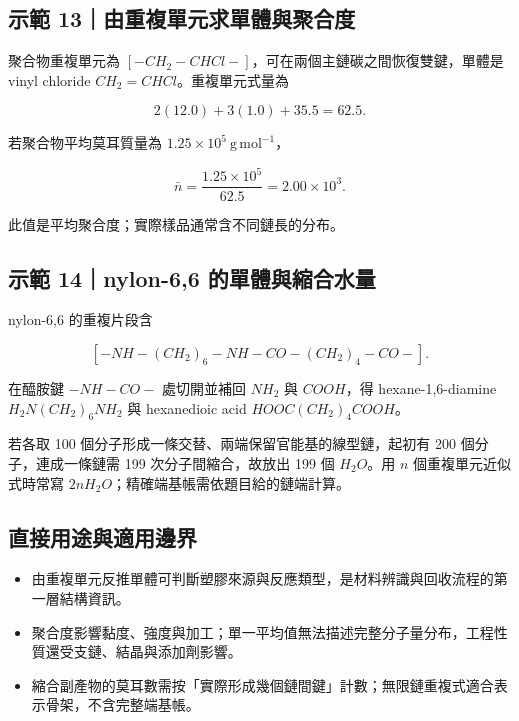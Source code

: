 \documentclass[11pt,a4paper]{article}
\providecommand{\tightlist}{%
  \setlength{\itemsep}{0pt}\setlength{\parskip}{0pt}}
\begin{document}
\begin{HandoutWorkedExample}

\subsection{示範 13｜由重複單元求單體與聚合度}\label{ux793aux7bc4-13ux7531ux91cdux8907ux55aeux5143ux6c42ux55aeux9ad4ux8207ux805aux5408ux5ea6}

聚合物重複單元為 \([-CH_2-CHCl-]\)，可在兩個主鏈碳之間恢復雙鍵，單體是 vinyl chloride \(CH_2=CHCl\)。重複單元式量為

\[
2(12.0)+3(1.0)+35.5=62.5.
\]

若聚合物平均莫耳質量為 \(1.25\times10^5\ \mathrm{g\,mol^{-1}}\)，

\[
\bar n=\frac{1.25\times10^5}{62.5}=2.00\times10^3.
\]

此值是平均聚合度；實際樣品通常含不同鏈長的分布。

\end{HandoutWorkedExample}

\begin{HandoutWorkedExample}

\subsection{示範 14｜nylon-6,6 的單體與縮合水量}\label{ux793aux7bc4-14nylon-66-ux7684ux55aeux9ad4ux8207ux7e2eux5408ux6c34ux91cf}

nylon-6,6 的重複片段含

\[
[-NH-(CH_2)_6-NH-CO-(CH_2)_4-CO-].
\]

在醯胺鍵 \(-NH-CO-\) 處切開並補回 \(NH_2\) 與 \(COOH\)，得 hexane-1,6-diamine \(H_2N(CH_2)_6NH_2\) 與 hexanedioic acid \(HOOC(CH_2)_4COOH\)。

若各取 100 個分子形成一條交替、兩端保留官能基的線型鏈，起初有 200 個分子，連成一條鏈需 199 次分子間縮合，故放出 199 個 \(H_2O\)。用 \(n\) 個重複單元近似式時常寫 \(2nH_2O\)；精確端基帳需依題目給的鏈端計算。

\end{HandoutWorkedExample}

\subsection{直接用途與適用邊界}\label{ux76f4ux63a5ux7528ux9014ux8207ux9069ux7528ux908aux754c-6}

\begin{itemize}
\tightlist
\item
  由重複單元反推單體可判斷塑膠來源與反應類型，是材料辨識與回收流程的第一層結構資訊。
\item
  聚合度影響黏度、強度與加工；單一平均值無法描述完整分子量分布，工程性質還受支鏈、結晶與添加劑影響。
\item
  縮合副產物的莫耳數需按「實際形成幾個鏈間鍵」計數；無限鏈重複式適合表示骨架，不含完整端基帳。
\end{itemize}
\end{document}
